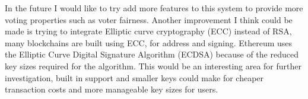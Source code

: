 \documentclass{entcs}
\begin{document}
In the future I would like to try add more features to this system to provide more voting properties such as voter fairness. Another improvement I think could be made is trying to integrate Elliptic curve cryptography (ECC) instead of RSA, many blockchains are built using ECC, for address and signing. Ethereum uses the Elliptic Curve Digital Signature Algorithm (ECDSA) because of the reduced key sizes required for the algorithm. This would be an interesting area for further investigation, built in support and smaller keys could make for cheaper transaction costs and more manageable key sizes for users.
\printbibliography
\end{document}
